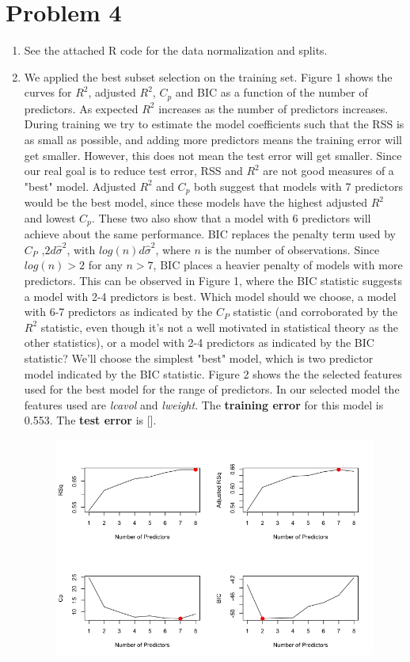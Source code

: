 \section*{Problem 4}
\begin{enumerate}
\item See the attached R code for the data normalization and splits.
\item We applied the best subset selection on the training set. Figure 1 shows the curves for $R^2$, adjusted $R^2$, $C_p$ and BIC as a function of the number of predictors. As expected $R^2$ increases as the number of predictors increases. During training we try to estimate the model coefficients such that the RSS is as small as possible, and adding more predictors means the training error will get smaller. However, this does not mean the test error will get smaller. Since our real goal is to reduce test error, RSS and $R^2$ are not good measures of a "best" model. Adjusted $R^2$ and $C_p$ both suggest that models with 7 predictors would be the best model, since these models have the highest adjusted $R^2$ and lowest $C_p$. These two also show that a model with 6 predictors will achieve about the same performance. BIC replaces the penalty term used by $C_P$ ,$2d\hat{\sigma}^2$, with $log(n)d\hat{\sigma}^2$, where $n$ is the number of observations. Since $log(n) > 2$ for any $n >7$, BIC places a heavier penalty of models with more predictors. This can be observed in Figure 1, where the BIC statistic suggests a model with 2-4 predictors is best. Which model should we choose, a model with 6-7 predictors as indicated by the $C_P$ statistic (and corroborated by the $R^2$ statistic, even though it's not a well motivated in statistical theory as the other statistics), or a model with 2-4 predictors as indicated by the BIC statistic? We'll choose the simplest "best" model, which is two predictor model indicated by the BIC statistic. Figure 2 shows the the selected features used for the best model for the range of predictors. In our selected model the features used are \textit{lcavol} and \textit{lweight}.  The \textbf{training error} for this model is 0.553. The \textbf{test error} is []. 
\newline
\begin{figure}[htbp]
\centering
\includegraphics[scale=0.7]{Best_subset.png}

\end{figure}
\end{enumerate}
